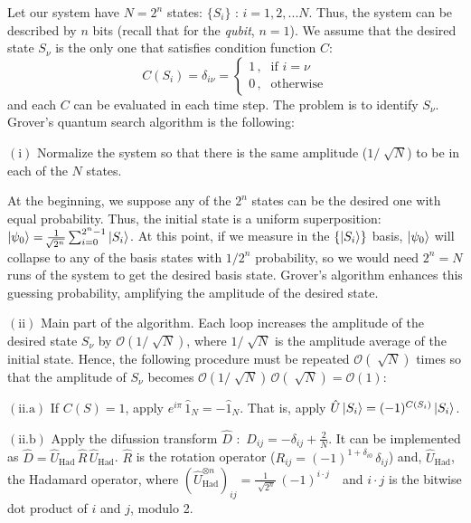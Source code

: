 \documentclass[11pt]{article}
\numberwithin{equation}{section} %
\numberwithin{figure}{section} %
\begin{document}
\begin{appendices}
Let our system have $N=2^n$ states: $\{ S_i \}$ : $i=1,2,... N$. Thus, the system can be described by $n$ bits (recall that for the \emph{qubit}, $n=1$). We assume that the desired state $S_\nu$ is the only one that satisfies condition function $C$: 
\begin{equation} 
  C(S_i)= \delta_{i\nu} = \begin{cases}
 1\,\textrm{,} & \text{if $i=\nu$} \\
 0\,\textrm{,} & \text{otherwise}
  \end{cases}
\end{equation}
and each $C$ can be evaluated in each time step. The problem is to identify $S_\nu$. $\,\,$ \cite[p.~3, l.~20-26]{Grover}\\

Grover's quantum search algorithm is the following: $\,\,$ \cite[p.~3]{Grover}

\noindent $(\textrm{i})$ Normalize the system so that there is the same amplitude ($1/\sqrt[]{N}$) to be in each of the $N$ states.

At the beginning, we suppose any of the $2^n$ states can be the desired one with equal probability. Thus, the initial state is a uniform superposition: $\ket{\psi_0}=\frac{1}{\sqrt[]{2^n}}\sum_{i=0}^{2^n-1}\ket{S_i}$. At this point, if we measure in the $\{\ket{S_i}\}$ basis, $\ket{\psi_0}$ will collapse to any of the basis states with $1/2^n$ probability, so we would need $2^n=N$ runs of the system to get the desired basis state. Grover's algorithm enhances this guessing probability, amplifying the amplitude of the desired state.

\noindent $(\textrm{ii})$ Main part of the algorithm. Each loop increases the amplitude of the desired state $S_\nu$ by $\mathcal{O}(1/\sqrt[]{N})$, where $1/\sqrt[]{N}$ is the amplitude average of the initial state. Hence, the following procedure must be repeated $\mathcal{O}(\sqrt[]{N})$ times so that the amplitude of $S_\nu$ becomes $\mathcal{O}(1/\sqrt[]{N})\,\mathcal{O}(\sqrt[]{N})=\mathcal{O}(1)$:

$(\textrm{ii.a})$ If $C(S)=1$, apply $e^{i\pi}\,\hat{1}_N = -\hat{1}_N$. That is, apply $\hat{U}\ket{S_i}=(-1)^{C(S_i)}\ket{S_i}$.

$(\textrm{ii.b})$ Apply the difussion transform $\hat{D}$ $:$ $D_{ij}= -\delta_{ij}+\frac{2}{N}$. It can be implemented as $\hat{D}=\hat{U}_{\textrm{Had}}\,\hat{R}\,\hat{U}_{\textrm{Had}}$. $\hat{R}$ is the rotation operator ($R_{ij}=(-1)^{1+\delta_{i0}}\,\delta_{ij}$) and, $\hat{U}_{\textrm{Had}}$, the Hadamard operator, where $\left( \hat{U}^{\otimes n}_{\textrm{Had}}\right)_{ij}=\frac{1}{\sqrt[]{2^n}}\,(-1)^{i\cdot j}$ $\,\,$ \cite[p.~35, Eq.~(1.50) ]{Nielsen} and $i\cdot j$ is the bitwise dot product of $i$ and $j$,  modulo 2.


\end{appendices}
\end{document}
